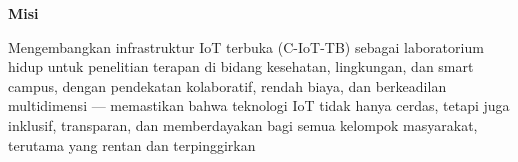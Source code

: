 \documentclass[11pt,a4paper]{article}
\newenvironment{vision}{%
  \begin{list}{}{%
    \setlength{\leftmargin}{1cm}%
    \setlength{\rightmargin}{1cm}%
    \setlength{\topsep}{1em}%
    \setlength{\partopsep}{0pt}%
    \setlength{\parsep}{0pt}%
    \setlength{\itemsep}{0pt}%
  }%
  \item\small
}{%
  \end{list}%
}
\begin{document}
\begin{vision}
    \begin{center}
        \textbf{\large Misi} \\
        \vspace{0.5em}
    \end{center}
    Mengembangkan infrastruktur IoT terbuka (C-IoT-TB) sebagai laboratorium hidup untuk penelitian terapan di bidang kesehatan, lingkungan, dan smart campus, dengan pendekatan kolaboratif, rendah biaya, dan berkeadilan multidimensi — memastikan bahwa teknologi IoT tidak hanya cerdas, tetapi juga inklusif, transparan, dan memberdayakan bagi semua kelompok masyarakat, terutama yang rentan dan terpinggirkan
\end{vision}




\end{document}
